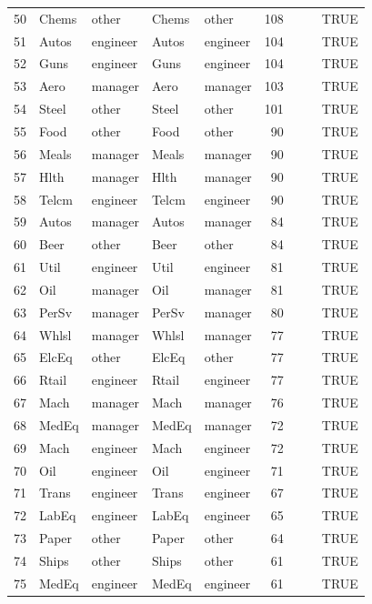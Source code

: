 \begin{table}[ht]
\begin{tabular}{rllllrrrl}
  50 & Chems & other & Chems & other & 108 &  &  & TRUE \\ 
  51 & Autos & engineer & Autos & engineer & 104 &  &  & TRUE \\ 
  52 & Guns & engineer & Guns & engineer & 104 &  &  & TRUE \\ 
  53 & Aero & manager & Aero & manager & 103 &  &  & TRUE \\ 
  54 & Steel & other & Steel & other & 101 &  &  & TRUE \\ 
  55 & Food & other & Food & other &  90 &  &  & TRUE \\ 
  56 & Meals & manager & Meals & manager &  90 &  &  & TRUE \\ 
  57 & Hlth & manager & Hlth & manager &  90 &  &  & TRUE \\ 
  58 & Telcm & engineer & Telcm & engineer &  90 &  &  & TRUE \\ 
  59 & Autos & manager & Autos & manager &  84 &  &  & TRUE \\ 
  60 & Beer & other & Beer & other &  84 &  &  & TRUE \\ 
  61 & Util & engineer & Util & engineer &  81 &  &  & TRUE \\ 
  62 & Oil & manager & Oil & manager &  81 &  &  & TRUE \\ 
  63 & PerSv & manager & PerSv & manager &  80 &  &  & TRUE \\ 
  64 & Whlsl & manager & Whlsl & manager &  77 &  &  & TRUE \\ 
  65 & ElcEq & other & ElcEq & other &  77 &  &  & TRUE \\ 
  66 & Rtail & engineer & Rtail & engineer &  77 &  &  & TRUE \\ 
  67 & Mach & manager & Mach & manager &  76 &  &  & TRUE \\ 
  68 & MedEq & manager & MedEq & manager &  72 &  &  & TRUE \\ 
  69 & Mach & engineer & Mach & engineer &  72 &  &  & TRUE \\ 
  70 & Oil & engineer & Oil & engineer &  71 &  &  & TRUE \\ 
  71 & Trans & engineer & Trans & engineer &  67 &  &  & TRUE \\ 
  72 & LabEq & engineer & LabEq & engineer &  65 &  &  & TRUE \\ 
  73 & Paper & other & Paper & other &  64 &  &  & TRUE \\ 
  74 & Ships & other & Ships & other &  61 &  &  & TRUE \\ 
  75 & MedEq & engineer & MedEq & engineer &  61 &  &  & TRUE \\ 

\end{tabular}
\end{table}
